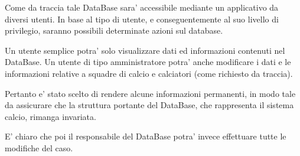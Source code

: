 \bigskip
\bigskip

Come da traccia tale DataBase sara' accessibile mediante un applicativo da diversi utenti.
In base al tipo di utente, e conseguentemente al suo livello di privilegio, saranno possibili
determinate azioni sul database.

Un utente semplice potra' solo visualizzare dati ed informazioni contenuti nel DataBase.
Un utente di tipo amministratore potra' anche modificare i dati e le informazioni relative a
squadre di calcio e calciatori (come richiesto da traccia).

Pertanto e' stato scelto di rendere alcune informazioni permanenti, in modo tale da assicurare
che la struttura portante del DataBase, che rappresenta il sistema calcio, rimanga invariata.

E' chiaro che poi il responsabile del DataBase potra' invece effettuare tutte le modifiche del caso.